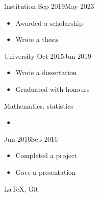 \documentclass{wgu-cv}
\begin{document}
\maketitle







{Institution}
{Sep 2019}{May 2023}

\begin{itemize}
  \item Awarded a scholarship
  \item Wrote a thesis 
\end{itemize}



{University}
{Oct 2015}{Jun 2019}


\begin{itemize}
    \item Wrote a dissertation
    \item Graduated with honours
\end{itemize}


Mathematics, statistics





\begin{itemize}
	\item {}
\end{itemize}




{}
{Jun 2016}{Sep 2016}

\begin{itemize}
  \item Completed a project
  \item Gave a presentation
\end{itemize}







LaTeX, Git






\end{document}

